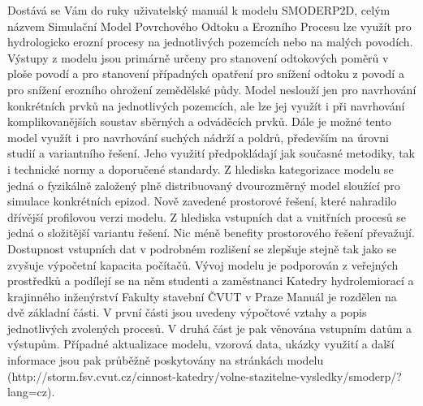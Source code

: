 


Dostává se Vám do ruky uživatelský manuál k modelu SMODERP2D, celým názvem Simulační Model Povrchového Odtoku a Erozního Procesu lze využít pro hydrologicko erozní procesy na jednotlivých pozemcích nebo na malých povodích. Výstupy z modelu jsou primárně určeny pro stanovení odtokových poměrů v ploše povodí a pro stanovení případných opatření pro snížení odtoku z povodí a pro snížení erozního ohrožení zemědělské půdy. Model neslouží jen pro navrhování konkrétních prvků na jednotlivých pozemcích, ale lze jej využít i při navrhování komplikovanějších soustav sběrných a odváděcích prvků. Dále je možné tento model využít i pro navrhování suchých nádrží a poldrů, především na úrovni studií a variantního řešení. Jeho využití předpokládají jak současné metodiky, tak i technické normy a doporučené standardy.
Z hlediska kategorizace modelu se jedná o fyzikálně založený plně distribuovaný dvourozměrný model sloužící pro simulace konkrétních epizod. Nově zavedené prostorové řešení, které nahradilo dřívější profilovou verzi modelu. Z hlediska vstupních dat a vnitřních procesů se jedná o složitější variantu řešení. Nic méně benefity prostorového řešení převažují. Dostupnost vstupních dat v podrobném rozlišení se zlepšuje stejně tak jako se zvyšuje výpočetní kapacita počítačů. Vývoj modelu je podporován z veřejných prostředků a podílejí se na něm studenti a zaměstnanci Katedry hydrolemiorací a krajinného inženýrství Fakulty stavební ČVUT v Praze
Manuál je rozdělen na dvě základní části. V první části jsou uvedeny výpočtové vztahy a popis jednotlivých zvolených procesů. V druhá část je pak věnována vstupním datům a výstupům.
Případné aktualizace modelu, vzorová data, ukázky využití a další informace jsou pak průběžně poskytovány na stránkách  modelu (http://storm.fsv.cvut.cz/cinnost-katedry/volne-stazitelne-vysledky/smoderp/?lang=cz).